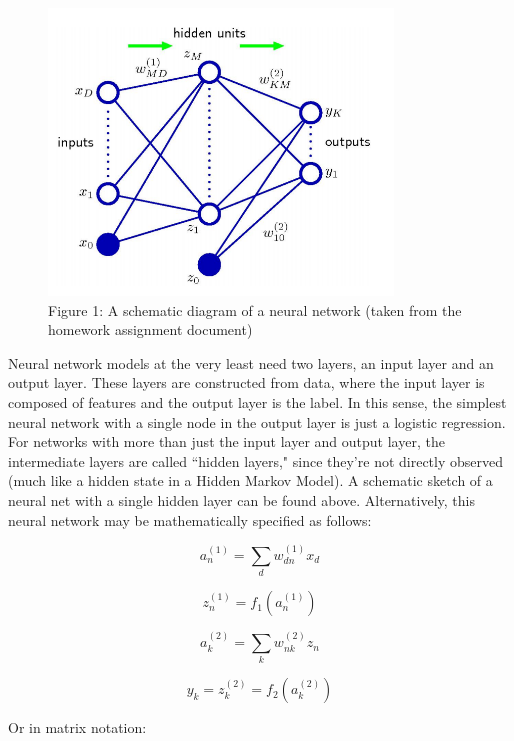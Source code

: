 \documentclass[10pt]{article}
\begin{document}
\begin{figure}[ht]
	\centering
	\includegraphics[height=3in]{neuralnetdiagram.png}
	\caption*{Figure 1: A schematic diagram of a neural network (taken from the homework assignment document)}
\end{figure}

Neural network models at the very least need two layers, an input layer and an output layer. These layers are constructed from  data, where the input layer is composed of features and the output layer is the label. In this sense, the simplest neural network  with a single node in the output layer is just a logistic regression. For networks with more than just the input layer and output layer, the intermediate layers are called ``hidden layers," since they're not directly observed (much like a hidden state in a Hidden Markov Model). A schematic sketch of a neural net with a single hidden layer can be found above. Alternatively, this neural network may be mathematically specified as follows:

\begin{equation}
a_{n}^{(1)} = \sum_d w_{dn}^{(1)}x_d
\end{equation}

\begin{equation}
z_{n}^{(1)} = f_1(a_n^{(1)})
\end{equation}

\begin{equation}
a_{k}^{(2)} = \sum_k w_{nk}^{(2)}z_n
\end{equation}

\begin{equation}
y_k = z_{k}^{(2)} = f_2(a_k^{(2)})
\end{equation}

\noindent Or in matrix notation:
\end{document}
